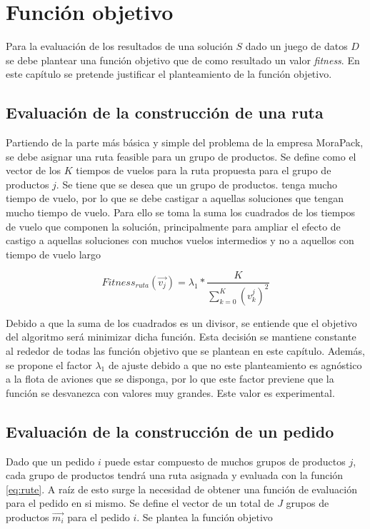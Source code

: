 \chapter{Función objetivo} \label{ch: fitness}
Para la evaluación de los resultados de una solución $S$ dado un juego de datos $D$ se debe plantear una función objetivo que de como resultado un valor \textit{fitness}. En este capítulo se pretende justificar el planteamiento de la función objetivo.

\section{Evaluación de la construcción de una ruta}
Partiendo de la parte más básica y simple del problema de la empresa MoraPack, se debe asignar una ruta feasible para un grupo de productos. Se define  como el vector de los $K$ tiempos de vuelos para la ruta propuesta para el grupo de productos $j$. Se tiene que se desea que un grupo de productos. tenga mucho tiempo de vuelo, por lo que se debe castigar a aquellas soluciones que tengan mucho tiempo de vuelo. Para ello se toma la suma los cuadrados de los tiempos de vuelo que componen la solución, principalmente para ampliar el efecto de castigo a aquellas soluciones con muchos vuelos intermedios y no a aquellos con tiempo de vuelo largo

\begin{equation}
    \label{eq:rute}
    Fitness_{ruta}(\overrightarrow{v_j}) = \lambda _1 * \frac{K}{\sum_{k = 0}^{K} (v^j_k)^2 }
\end{equation}

Debido a que la suma de los cuadrados es un divisor, se entiende que el objetivo del algoritmo será minimizar dicha función. Esta decisión se mantiene constante al rededor de todas las función objetivo que se plantean en este capítulo. Además, se propone el factor $\lambda _1$ de ajuste debido a que no este planteamiento es agnóstico a la flota de aviones que se disponga, por lo que este factor previene que la función se desvanezca con valores muy grandes. Este valor es experimental.

\section{Evaluación de la construcción de un pedido}
Dado que un pedido $i$ puede estar compuesto de muchos grupos de productos $j$, cada grupo de productos tendrá una ruta asignada y evaluada con la función \ref{eq:rute}. A raíz de esto surge la necesidad de obtener una función de evaluación para el pedido en si mismo. Se define el vector de un total de $J$ grupos de productos $\overrightarrow{m_i}$ para el pedido $i$. Se plantea la función objetivo

